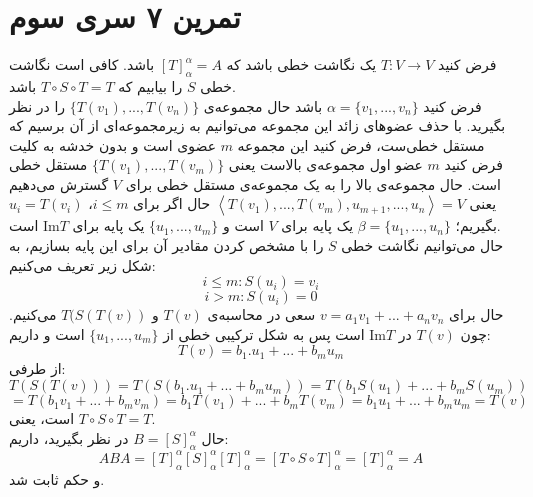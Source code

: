 \documentclass[12pt,a4paper]{article}
\begin{document}
\section{تمرین ۷ سری سوم}
فرض کنید 
$T: V \rightarrow V$
 یک نگاشت خطی باشد که 
$[T]_\alpha^\alpha = A$
باشد.
کافی است نگاشت خطی $S$ را بیابیم که
$T\circ S \circ T = T$
باشد.
\\
فرض کنید 
$\alpha = \{v_1, ..., v_n\}$
باشد حال مجموعه‌ی 
$\{T(v_1), ..., T(v_n)\}$
را در نظر بگیرید. با حذف عضوهای زائد این مجموعه می‌توانیم به زیرمجموعه‌ای از آن برسیم که مستقل خطی‌ست، فرض کنید این مجموعه $m$ عضوی است و بدون خدشه به کلیت فرض کنید $m$ عضو اول مجموعه‌ی بالاست یعنی
$\{T(v_1), ..., T(v_m)\}$
مستقل خطی است. حال مجموعه‌ی بالا را به یک مجموعه‌ی مستقل خطی برای $V$ گسترش می‌دهیم یعنی
$\left\langle
T(v_1), ..., T(v_m), u_{m+1}, ..., u_n\right\rangle= V$
حال اگر برای $i \leq m$،
$u_i = T(v_i)$
بگیریم؛
$\beta = \{u_1, ..., u_n\}$
یک پایه برای $V$ است و 
$\{u_1, ..., u_m\}$
یک پایه برای 
$\text{Im}T$
است.
\\
حال می‌توانیم نگاشت خطی $S$ را با مشخص کردن مقادیر آن برای این پایه بسازیم، به شکل زیر تعریف می‌کنیم:
$$i \leq m: S(u_i) = v_i$$
$$i > m: S(u_i) = 0$$
حال برای $v = a_1 v_1 + ... + a_n v_n$ سعی در محاسبه‌ی $T(v)$ و $T(S(T(v))$ می‌کنیم.
 چون $T(v)$ در $\text{Im} T$ است پس به شکل ترکیبی خطی از
$\{u_1, ..., u_m\}$
است و داریم:
$$T(v) = b_1.u_1 + ... + b_m u_m$$
از طرفی:
$$
T(S(T(v))) = T(S(b_1.u_1 + ... + b_m u_m)) = T(b_1 S(u_1) + ... + b_m S(u_m)) $$$$= T(b_1 v_1 + ... + b_m v_m) = b_1 T(v_1) + ... + b_m T(v_m) = b_1 u_1 + ... + b_m u_m = T(v)
$$
است، یعنی 
$T \circ S \circ T = T$.
\\
حال 
$B = [S]_\alpha^\alpha$
در نظر بگیرید، داریم:
$$
ABA = [T]_\alpha^\alpha [S]_\alpha^\alpha [T]_\alpha^\alpha =
[T \circ S \circ T]_\alpha^\alpha  = [T]_\alpha^\alpha = A
$$
و حکم ثابت شد.
\end{document}
